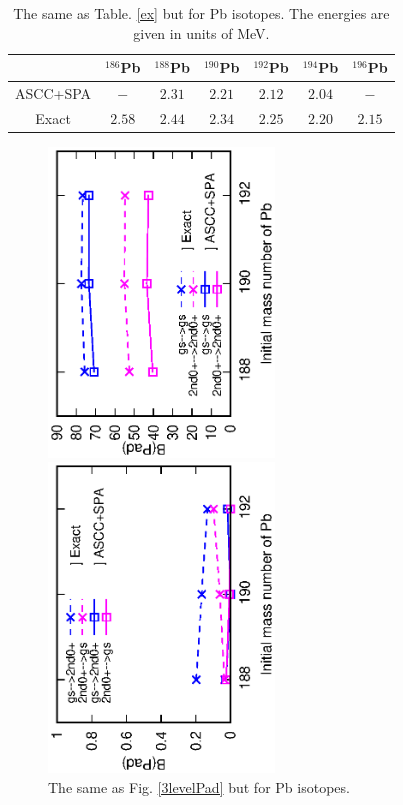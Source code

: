 \documentclass[%
superscriptaddress,
showpacs,
nofootinbib,
amsmath,amssymb,
aps,
prc,
twocolumn,
floatfix ]%
{revtex4-1}
\begin{document}
\begin{table}[htbp]
\begin{ruledtabular}
\begin{tabular}{c|cccccc}
   & ${}^{186}$Pb & ${}^{188}$Pb & ${}^{190}$Pb & ${}^{192}$Pb & ${}^{194}$Pb & ${}^{196}$Pb\\ \hline
ASCC+SPA & $-$ & $2.31$ & $2.21$ & $2.12$ & $2.04$ & $-$ \\ 
Exact & $2.58$ & $2.44$ & $2.34$ & $2.25$ & $2.20$ & $2.15$
\end{tabular}
\end{ruledtabular}
\caption{The same as Table. \ref{ex} but for Pb isotopes. The energies are given in units of MeV.}
\label{Pb_ex}
\end{table}
\begin{figure}[htbp]
 \begin{center}
  \includegraphics[width=60mm,angle=-90]{Pbintra_trans.eps}
 \end{center}
 \begin{center}
  \includegraphics[width=60mm,angle=-90]{Pbinter_trans.eps}
 \end{center}
	\caption{The same as Fig. \ref{3levelPad} but for Pb isotopes.
}
 \label{PbPad}
\end{figure}
\end{document}
